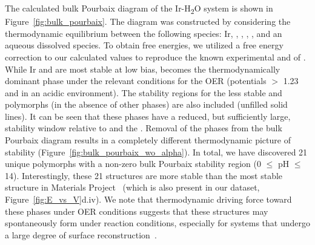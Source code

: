 %
%
The calculated bulk Pourbaix diagram of the Ir-H\textsubscript{2}O system is shown in Figure~\ref{fig:bulk_pourbaix}.
%
The diagram was constructed by considering the thermodynamic equilibrium between the following species: Ir, \rIrOtwo, \aIrOthree, \rIrOthree, \bIrOthree, and an aqueous dissolved \IrOfourm species.
%
To obtain free energies, we utilized a free energy correction to our calculated values to reproduce the known experimental \DHf and \DGf of \rIrOtwo.~\cite{Barin1995}
%
While Ir and \rIrOtwo are most stable at low bias, \aIrOthree becomes the thermodynamically dominant phase under the relevant conditions for the OER (potentials $>$ \num{1.23} \VRHE and in an acidic environment).
%
The stability regions for the less stable \bIrOthree and \rIrOthree polymorphs (in the absence of other \IrOthree phases) are also included (unfilled solid lines).
%
It can be seen that these phases have a reduced, but sufficiently large, stability window relative to \IrOtwo and the \IrOfourm.
%
Removal of the \IrOthree phases from the bulk Pourbaix diagram results in a completely different thermodynamic picture of \IrOtwo stability (Figure~\ref{fig:bulk_pourbaix_wo_alpha}).
In total, we have discovered 21 unique \IrOthree polymorphs with a non-zero bulk Pourbaix stability region
(0 $\leq$ pH $\leq$ 14).
%
Interestingly, these 21 structures are more stable than the most stable \IrOthree structure in Materials Project~\cite{mp-1097041} (which is also present in our dataset, Figure~\ref{fig:E_vs_V}d.iv).
%
We note that thermodynamic driving force toward these \IrOthree phases under OER conditions suggests that these structures may spontaneously form under reaction conditions,
especially for systems that undergo a large degree of surface reconstruction~\cite{Seitz2016}.


